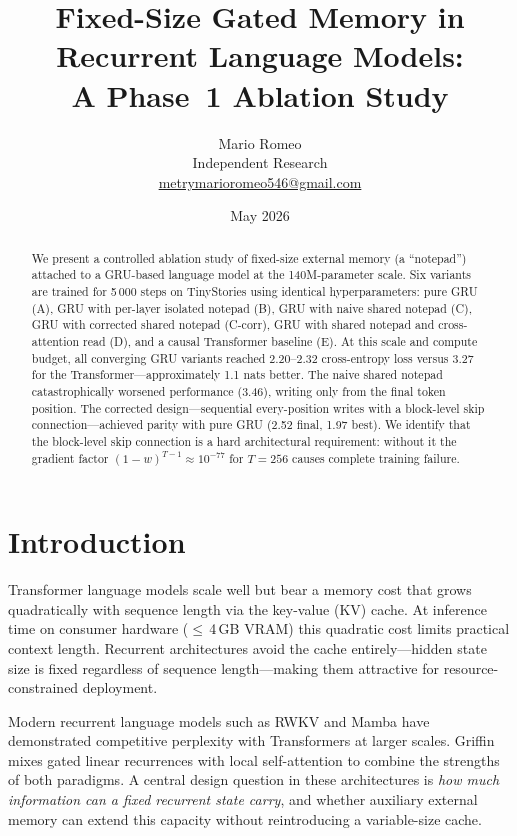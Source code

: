 \documentclass[11pt,a4paper]{article}
\title{\textbf{Fixed-Size Gated Memory in Recurrent Language Models:\\
A Phase~1 Ablation Study}}
\author{Mario Romeo\\
{\small Independent Research}\\
{\small \href{mailto:metrymarioromeo546@gmail.com}{metrymarioromeo546@gmail.com}}
}
\date{May 2026}
\begin{document}
\maketitle

\begin{abstract}
We present a controlled ablation study of fixed-size external memory (a
``notepad'') attached to a GRU-based language model at the 140M-parameter
scale.  Six variants are trained for 5\,000 steps on TinyStories using
identical hyperparameters: pure GRU (A), GRU with per-layer isolated
notepad (B), GRU with naive shared notepad (C), GRU with corrected shared
notepad (C-corr), GRU with shared notepad and cross-attention read (D), and
a causal Transformer baseline (E).  At this scale and compute budget, all
converging GRU variants reached 2.20--2.32 cross-entropy loss versus 3.27
for the Transformer---approximately 1.1 nats better.  The naive shared
notepad catastrophically worsened performance (3.46), writing only from the
final token position.  The corrected design---sequential every-position
writes with a block-level skip connection---achieved parity with pure GRU
(2.52 final, 1.97 best).  We identify that the block-level skip connection
is a hard architectural requirement: without it the gradient factor
$(1-w)^{T-1} \approx 10^{-77}$ for $T{=}256$ causes complete training
failure.
\end{abstract}

\section{Introduction}
\label{sec:intro}

Transformer language models scale well but bear a memory cost that grows
quadratically with sequence length via the key-value (KV) cache.  At
inference time on consumer hardware ($\leq$\,4\,GB VRAM) this quadratic
cost limits practical context length.  Recurrent architectures avoid the
cache entirely---hidden state size is fixed regardless of sequence
length---making them attractive for resource-constrained deployment.

Modern recurrent language models such as RWKV \cite{peng2023rwkv} and
Mamba \cite{gu2023mamba} have demonstrated competitive perplexity with
Transformers at larger scales.  Griffin \cite{de2024griffin} mixes gated
linear recurrences with local self-attention to combine the strengths of
both paradigms.  A central design question in these architectures is
\emph{how much information can a fixed recurrent state carry}, and whether
auxiliary external memory can extend this capacity without reintroducing a
variable-size cache.
\end{document}
